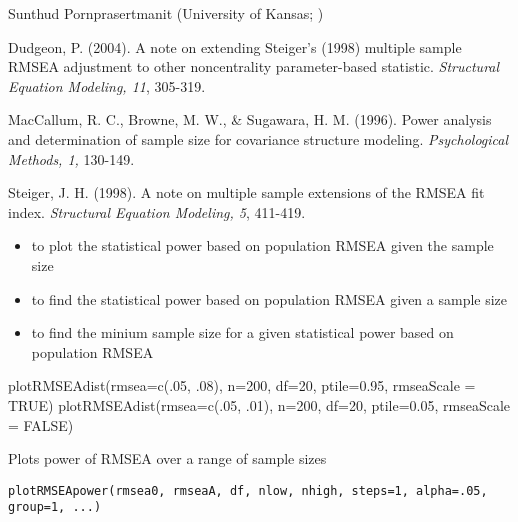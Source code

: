 \documentclass[a4paper]{book}
\begin{document}
%
\begin{Author}\relax
Sunthud Pornprasertmanit (University of Kansas; )
\end{Author}
%
\begin{References}\relax
Dudgeon, P. (2004). A note on extending Steiger's (1998) multiple sample RMSEA adjustment to other noncentrality parameter-based statistic. \emph{Structural Equation Modeling, 11}, 305-319.

MacCallum, R. C., Browne, M. W., \& Sugawara, H. M. (1996). Power analysis and determination of sample size for covariance structure modeling. \emph{Psychological Methods, 1,} 130-149.

Steiger, J. H. (1998). A note on multiple sample extensions of the RMSEA fit index. \emph{Structural Equation Modeling, 5}, 411-419.
\end{References}
%
\begin{SeeAlso}\relax
\begin{itemize}

\item {} to plot the statistical power based on population RMSEA given the sample size
\item {} to find the statistical power based on population RMSEA given a sample size
\item {} to find the minium sample size for a given statistical power based on population RMSEA

\end{itemize}

\end{SeeAlso}
%
\begin{Examples}
\begin{ExampleCode}
plotRMSEAdist(rmsea=c(.05, .08), n=200, df=20, ptile=0.95, rmseaScale = TRUE)
plotRMSEAdist(rmsea=c(.05, .01), n=200, df=20, ptile=0.05, rmseaScale = FALSE)
\end{ExampleCode}
\end{Examples}
%
\begin{Description}\relax
Plots power of RMSEA over a range of sample sizes
\end{Description}
%
\begin{Usage}
\begin{verbatim}
plotRMSEApower(rmsea0, rmseaA, df, nlow, nhigh, steps=1, alpha=.05, group=1, ...)
\end{verbatim}
\end{Usage}
\end{document}
